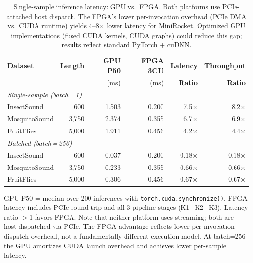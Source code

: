 
\begin{table}[t]
\centering
\caption{Single-sample inference latency: GPU vs.\ FPGA. Both platforms use
PCIe-attached host dispatch. The FPGA's lower per-invocation overhead (PCIe
DMA vs.\ CUDA runtime) yields 4--8$\times$ lower latency for MiniRocket.
Optimized GPU implementations (fused CUDA kernels, CUDA graphs) could
reduce this gap; results reflect standard PyTorch + cuDNN.}
\label{tab:batch1_latency}
\begin{tabular}{l r r r r r}
\toprule
\textbf{Dataset} & \textbf{Length} & \textbf{GPU P50} & \textbf{FPGA 3CU} & \textbf{Latency} & \textbf{Throughput} \\
 & & (ms) & (ms) & \textbf{Ratio} & \textbf{Ratio} \\
\midrule
\multicolumn{6}{l}{\textit{Single-sample (batch\,=\,1)}} \\
InsectSound   & 600   & 1.503 & 0.200 & 7.5$\times$ & 8.2$\times$ \\
MosquitoSound & 3{,}750 & 2.374 & 0.355 & 6.7$\times$ & 6.9$\times$ \\
FruitFlies    & 5{,}000 & 1.911 & 0.456 & 4.2$\times$ & 4.4$\times$ \\
\midrule
\multicolumn{6}{l}{\textit{Batched (batch\,=\,256)}} \\
InsectSound   & 600   & 0.037 & 0.200 & 0.18$\times$ & 0.18$\times$ \\
MosquitoSound & 3{,}750 & 0.233 & 0.355 & 0.66$\times$ & 0.66$\times$ \\
FruitFlies    & 5{,}000 & 0.306 & 0.456 & 0.67$\times$ & 0.67$\times$ \\
\bottomrule
\end{tabular}

\vspace{0.3em}
\footnotesize
GPU P50 = median over 200 inferences with \texttt{torch.cuda.synchronize()}.
FPGA latency includes PCIe round-trip and all 3 pipeline stages (K1+K2+K3).
Latency ratio $>$1 favors FPGA. Note that neither platform uses streaming;
both are host-dispatched via PCIe. The FPGA advantage reflects lower
per-invocation dispatch overhead, not a fundamentally different execution model.
At batch=256 the GPU amortizes CUDA launch overhead and achieves lower
per-sample latency.
\end{table}
